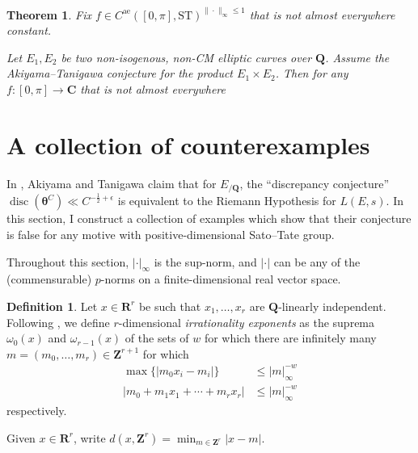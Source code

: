 \documentclass{article}
\DeclareMathOperator{\disc}{disc}
\newcommand{\bC}{\mathbf{C}}
\newcommand{\bQ}{\mathbf{Q}}
\newcommand{\bR}{\mathbf{R}}
\newcommand{\btheta}{{\boldsymbol{\theta}}}
\newcommand{\bZ}{\mathbf{Z}}
\newcommand{\alev}{\mathrm{ae}}
\newcommand{\ST}{\mathrm{ST}}
\newtheorem{theorem}[subsection]{Theorem}
\theoremstyle{definition}
\newtheorem{definition}[subsection]{Definition}
\begin{document}
\begin{theorem}
Fix $f\in C^\alev([0,\pi],\ST)^{\|\cdot\|_\infty\leqslant 1}$ that is not 
almost everywhere constant. 

Let $E_1,E_2$ be two non-isogenous, non-CM elliptic curves over $\bQ$. 
Assume the Akiyama--Tanigawa conjecture for the product $E_1\times E_2$. 
Then for any $f\colon [0,\pi]\to \bC$ that is not almost everywhere 
\end{theorem}






\section{A collection of counterexamples}

In \cite[?]{akiyama-tanigawa}, Akiyama and Tanigawa claim that for $E_{/\bQ}$, 
the ``discrepancy conjecture'' $\disc(\btheta^C)\ll C^{-\frac 1 2+\epsilon}$ is 
equivalent to the Riemann Hypothesis for $L(E,s)$. In this section, I construct 
a collection of examples which show that their conjecture is false for any 
motive with positive-dimensional Sato--Tate group. 

Throughout this section, $|\cdot|_\infty$ is the sup-norm, and $|\cdot|$ can be 
any of the (commensurable) $p$-norms on a finite-dimensional real vector space. 

\begin{definition}\label{def:irrationality-exponent}
Let $x\in \bR^r$ be such that $x_1,\dots,x_r$ are $\bQ$-linearly independent. 
Following \cite{laurent-2009}, we define $r$-dimensional \emph{irrationality 
exponents} as the suprema $\omega_0(x)$ and $\omega_{r-1}(x)$ of the sets of 
$w$ for which there are infinitely many $m=(m_0,\dots,m_r)\in \bZ^{r+1}$ for 
which 
\begin{align*}
	\max \{ |m_0x_i-m_i| \} &\leqslant |m|_\infty^{-w} \\
	|m_0 + m_1 x_1 + \cdots + m_r x_r| &\leqslant |m|_\infty^{-w} 
\end{align*}
respectively. 
\end{definition}

Given $x\in \bR^r$, write $d(x,\bZ^r)=\min_{m\in \bZ^r} |x-m|$. 
\end{document}

